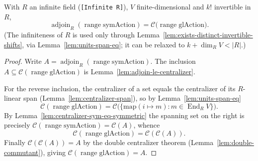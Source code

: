 \begin{theorem}
    \label{thm:main}
    \leanok
    With $R$ an infinite field (\texttt{[Infinite R]}), $V$ finite-dimensional and $k!$ invertible in $R$,
    \[
        \operatorname{adjoin}_R(\operatorname{range}\mathrm{symAction})
          = \mathcal{C}\bigl(\operatorname{range}\mathrm{glAction}\bigr).
    \]
    (The infiniteness of $R$ is used only through Lemma~\ref{lem:exists-distinct-invertible-shifts}, via
    Lemma~\ref{lem:units-span-eq}; it can be relaxed to $k + \dim_R V < |R|$.)
\end{theorem}
\begin{proof}
    Write $A = \operatorname{adjoin}_R(\operatorname{range}\mathrm{symAction})$. The inclusion
    $A \subseteq \mathcal{C}(\operatorname{range}\mathrm{glAction})$ is
    Lemma~\ref{lem:adjoin-le-centralizer}.

    For the reverse inclusion, the centralizer of a set equals the centralizer of its $R$-linear span
    (Lemma~\ref{lem:centralizer-span}), so by Lemma~\ref{lem:units-span-eq}
    \[
        \mathcal{C}(\operatorname{range}\mathrm{glAction})
          = \mathcal{C}\bigl(\{\mathrm{map}(i \mapsto m) : m \in \operatorname{End}_R V\}\bigr).
    \]
    By Lemma~\ref{lem:centralizer-sym-eq-symmetric} the spanning set on the right is precisely
    $\mathcal{C}(\operatorname{range}\mathrm{symAction}) = \mathcal{C}(A)$, whence
    \[
        \mathcal{C}(\operatorname{range}\mathrm{glAction}) = \mathcal{C}(\mathcal{C}(A)).
    \]
    Finally $\mathcal{C}(\mathcal{C}(A)) = A$ by the double centralizer theorem
    (Lemma~\ref{lem:double-commutant}), giving
    $\mathcal{C}(\operatorname{range}\mathrm{glAction}) = A$.
\end{proof}


